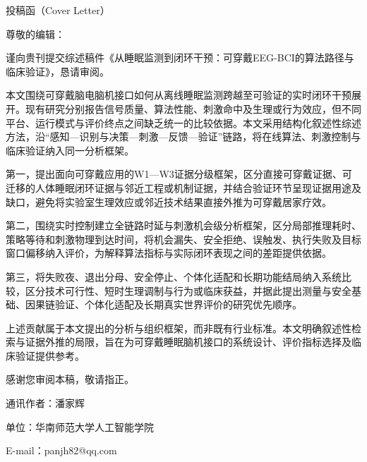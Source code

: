 \documentclass[UTF8,zihao=5,fontset=none]{ctexart}
\newcommand{\song}{\CJKfamily{song}}
\begin{document}
\thispagestyle{empty}
\begin{center}
  {\song\fontsize{22pt}{33pt}\selectfont 投稿函（{Cover Letter}）\par}
\end{center}
\vspace{48pt}
{\song\fontsize{14pt}{16.8pt}\selectfont
\setlength{\parindent}{2em}
\noindent 尊敬的编辑：\par

谨向贵刊提交综述稿件《从睡眠监测到闭环干预：可穿戴EEG-BCI的算法路径与临床验证》，恳请审阅。\par

本文围绕可穿戴脑电脑机接口如何从离线睡眠监测跨越至可验证的实时闭环干预展开。现有研究分别报告信号质量、算法性能、刺激命中及生理或行为效应，但不同平台、运行模式与评价终点之间缺乏统一的比较依据。本文采用结构化叙述性综述方法，沿“感知—识别与决策—刺激—反馈—验证”链路，将在线算法、刺激控制与临床验证纳入同一分析框架。\par

第一，提出面向可穿戴应用的W1—W3证据分级框架，区分直接可穿戴证据、可迁移的人体睡眠闭环证据与邻近工程或机制证据，并结合验证环节呈现证据用途及缺口，避免将实验室生理效应或邻近技术结果直接外推为可穿戴居家疗效。\par

第二，围绕实时控制建立全链路时延与刺激机会级分析框架，区分局部推理耗时、策略等待和刺激物理到达时间，将机会漏失、安全拒绝、误触发、执行失败及目标窗口偏移纳入评价，为解释算法指标与实际闭环表现之间的差距提供依据。\par

第三，将失败夜、退出分母、安全停止、个体化适配和长期功能结局纳入系统比较，区分技术可行性、短时生理调制与行为或临床获益，并据此提出测量与安全基础、因果链验证、个体化适配及长期真实世界评价的研究优先顺序。\par

上述贡献属于本文提出的分析与组织框架，而非既有行业标准。本文明确叙述性检索与证据外推的局限，旨在为可穿戴睡眠脑机接口的系统设计、评价指标选择及临床验证提供参考。\par

感谢您审阅本稿，敬请指正。\par
\vspace{12pt}
\noindent 通讯作者：潘家辉\par
\noindent 单位：华南师范大学人工智能学院\par
\noindent E-mail：panjh82@qq.com\par}
\end{document}
